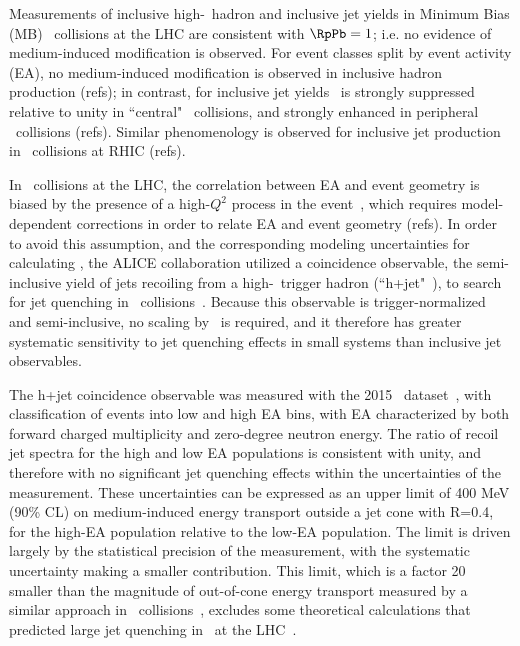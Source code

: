 \documentclass[../report.tex]{subfiles}
\begin{document}

Measurements of inclusive high-\pT\ hadron and inclusive jet yields in Minimum Bias (MB) \pPb\ collisions at the LHC are consistent with $\RpPb = 1$; i.e. no evidence of medium-induced modification is observed. For event classes split by event activity (EA), no medium-induced modification is observed in inclusive hadron production (refs); in contrast, for inclusive jet yields \RpPb\ is strongly suppressed relative to unity in ``central" \pPb\ collisions, and strongly enhanced in peripheral \pPb\ collisions (refs). Similar phenomenology is observed for inclusive jet production in \dAu\ collisions at RHIC (refs).

In \pPb\ collisions at the LHC, the correlation between EA and event geometry is biased by the presence of a high-$Q^2$ process in the event~\cite{Acharya:2017okq}, which requires model-dependent corrections in order to relate EA and event geometry (refs). In order to avoid this assumption, and the corresponding modeling uncertainties for calculating \TAA, the ALICE collaboration utilized a coincidence observable, the semi-inclusive yield of jets recoiling from a high-\pT\ trigger hadron (``h+jet"~\cite{Adam:2015doa}), to search for jet quenching in \pPb\ collisions~\cite{Acharya:2017okq}. Because this observable is trigger-normalized and semi-inclusive, no scaling by \TAA\ is required, and it therefore has greater systematic sensitivity to jet quenching effects in small systems than inclusive jet observables.

The h+jet coincidence observable was measured with the 2015 \pPb\ dataset~\cite{Acharya:2017okq}, with classification of events into low and high EA bins, with EA characterized by both forward charged multiplicity and zero-degree neutron energy. The ratio of recoil jet spectra for the high and low EA populations is consistent with unity, and therefore with no significant jet quenching effects within the uncertainties of the measurement. These uncertainties can be expressed as an upper limit of 400 MeV (90\% CL) on medium-induced energy transport outside a jet cone with R=0.4, for the high-EA population relative to the low-EA population. The limit is driven largely by the statistical precision of the measurement, with the systematic uncertainty making a smaller contribution. This limit, which is a factor 20 smaller than the magnitude of out-of-cone energy transport measured by a similar approach in \PbPb\ collisions~\cite{Adam:2015doa}, excludes some theoretical calculations that predicted large jet quenching in \pPb\ at the LHC~\cite{Acharya:2017okq}.
\end{document}
